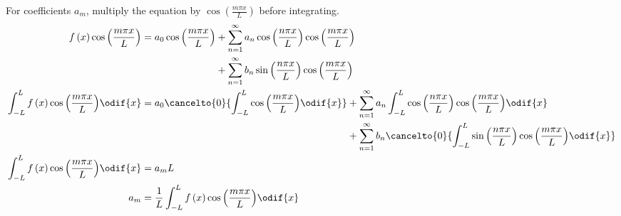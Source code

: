 \documentclass{article}
\begin{document}
For coefficients \(a_m\), multiply the equation by \(\cos{\left( \frac{m \pi x}{L} \right)}\) before integrating.
\begin{align*}
    f\left( x \right) \cos{\left( \frac{m \pi x}{L} \right)}                      & = \begin{aligned}[t]
                                                                                          a_0 \cos{\left( \frac{m \pi x}{L} \right)} & + \sum_{n = 1}^\infty a_n \cos{\left( \frac{n \pi x}{L} \right)} \cos{\left( \frac{m \pi x}{L} \right)} \\
                                                                                                                                     & + \sum_{n = 1}^\infty b_n \sin{\left( \frac{n \pi x}{L} \right)} \cos{\left( \frac{m \pi x}{L} \right)}
                                                                                      \end{aligned}                                                                                        \\
    \int_{-L}^L f\left( x \right) \cos{\left( \frac{m \pi x}{L} \right)} \odif{x} & = \begin{aligned}[t]
                                                                                          a_0 \cancelto{0}{\int_{-L}^L \cos{\left( \frac{m \pi x}{L} \right)} \odif{x}} & + \sum_{n = 1}^\infty a_n \int_{-L}^L \cos{\left( \frac{n \pi x}{L} \right)} \cos{\left( \frac{m \pi x}{L} \right)} \odif{x}               \\
                                                                                                                                                                        & + \sum_{n = 1}^\infty b_n \cancelto{0}{\int_{-L}^L \sin{\left( \frac{n \pi x}{L} \right)} \cos{\left( \frac{m \pi x}{L} \right)} \odif{x}}
                                                                                      \end{aligned} \\
    \int_{-L}^L f\left( x \right) \cos{\left( \frac{m \pi x}{L} \right)} \odif{x} & = a_m L                                                                                                                                                                                                                     \\
    a_m                                                                           & = \frac{1}{L} \int_{-L}^L f\left( x \right) \cos{\left( \frac{m \pi x}{L} \right)} \odif{x}
\end{align*}
\end{document}
